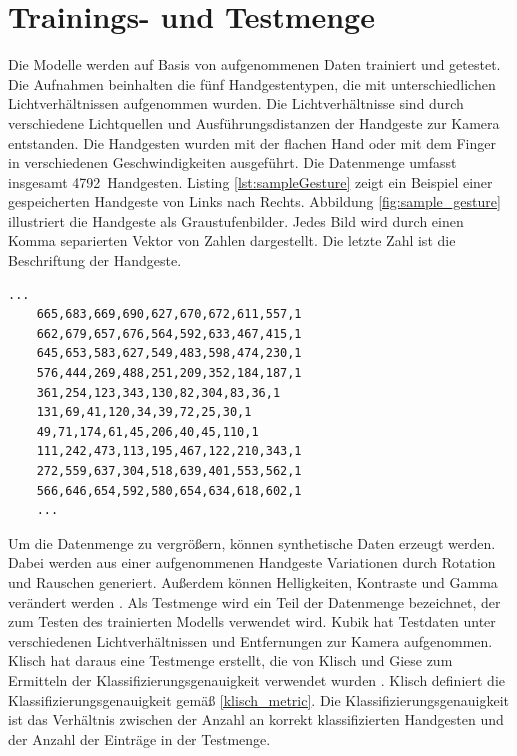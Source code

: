 \section{Trainings- und Testmenge}
\label{sec:synthetischeDaten}
\label{sec:testdaten}
Die Modelle werden auf Basis von aufgenommenen Daten trainiert und getestet. Die Aufnahmen beinhalten die fünf Handgestentypen, die mit unterschiedlichen Lichtverhältnissen aufgenommen wurden. Die Lichtverhältnisse
sind durch verschiedene Lichtquellen und Ausführungsdistanzen der Handgeste zur Kamera entstanden. Die Handgesten wurden mit der flachen Hand oder mit dem Finger in verschiedenen Geschwindigkeiten ausgeführt.
Die Datenmenge umfasst insgesamt 4792~Handgesten.
\newline
\newline
Listing \ref{lst:sampleGesture} zeigt ein Beispiel einer gespeicherten Handgeste von Links nach Rechts. Abbildung \ref{fig:sample_gesture} illustriert die Handgeste als Graustufenbilder.
Jedes Bild wird durch einen Komma separierten Vektor von Zahlen dargestellt. Die letzte Zahl ist die Beschriftung der Handgeste.
\begin{lstlisting}[label=lst:sampleGesture,caption={Beispiel einer gespeicherten Handgeste von Links nach Rechts.}]
    ...
    665,683,669,690,627,670,672,611,557,1
    662,679,657,676,564,592,633,467,415,1
    645,653,583,627,549,483,598,474,230,1
    576,444,269,488,251,209,352,184,187,1
    361,254,123,343,130,82,304,83,36,1
    131,69,41,120,34,39,72,25,30,1
    49,71,174,61,45,206,40,45,110,1
    111,242,473,113,195,467,122,210,343,1
    272,559,637,304,518,639,401,553,562,1
    566,646,654,592,580,654,634,618,602,1
    ...
\end{lstlisting}
Um die Datenmenge zu vergrößern, können synthetische Daten erzeugt werden. Dabei werden aus einer aufgenommenen Handgeste Variationen durch Rotation und Rauschen generiert. Außerdem können Helligkeiten,
Kontraste und Gamma verändert werden \cite{venzkeArticle}.
\newline
\newline
Als Testmenge wird ein Teil der Datenmenge bezeichnet, der zum Testen des trainierten Modells verwendet wird. Kubik hat Testdaten unter verschiedenen Lichtverhältnissen und Entfernungen zur Kamera aufgenommen.
Klisch hat daraus eine Testmenge erstellt, die von Klisch und Giese zum Ermitteln der Klassifizierungsgenauigkeit verwendet wurden \cite{klischThesis, gieseThesis}. Klisch definiert die
Klassifizierungsgenauigkeit gemäß \ref{klisch_metric}. Die Klassifizierungsgenauigkeit ist das Verhältnis zwischen der Anzahl an korrekt klassifizierten Handgesten und der Anzahl der Einträge in der Testmenge.
